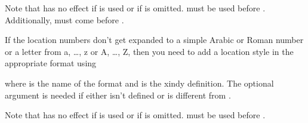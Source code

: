 \documentclass[report,inlinetitle]{nlctdoc}
\begin{document}
\begin{important}
Note that  has no effect if  is
used or if  is omitted.
 must be used before .
Additionally,  must come before
.
\end{important}

If the location numbers don't get expanded to a simple Arabic or 
Roman number or a letter from a, \ldots, z or A, \ldots, Z, then
you need to add a location style in the appropriate format using
\begin{definition}[\DescribeMacro{\GlsAddXdyLocation}]
\end{definition}
where  is the name of the format and  is
the \gls{xindy} definition. The optional argument 
is needed if \linebreak{} either isn't defined or is
different from .

\begin{important}
Note that  has no effect if  is
used or if  is omitted.
 must be used before .
\end{important}
\end{document}
